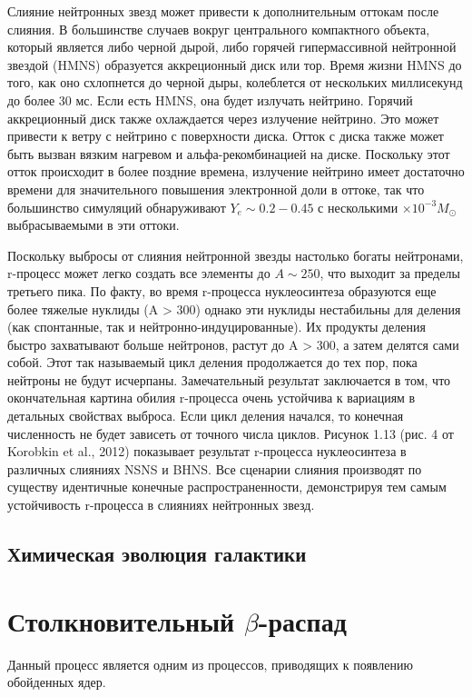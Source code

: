 \documentclass[%
master,    %
natbib,      %
subf,        %
href,        %
colorlinks,  %
]{disser}
\begin{document}
Слияние нейтронных звезд может привести к дополнительным оттокам после слияния. В большинстве случаев вокруг центрального компактного объекта, который является либо черной дырой, либо горячей гипермассивной нейтронной звездой (HMNS) образуется аккреционный диск или тор. Время жизни HMNS до того, как оно схлопнется до черной дыры, колеблется от нескольких миллисекунд до более 30 мс. Если есть HMNS, она будет излучать нейтрино. Горячий аккреционный диск также охлаждается через излучение нейтрино. Это может привести к ветру с нейтрино с поверхности диска. Отток с диска также может быть вызван вязким нагревом и альфа-рекомбинацией на диске. Поскольку этот отток происходит в более поздние времена, излучение нейтрино имеет достаточно времени для значительного повышения электронной доли в оттоке, так что большинство симуляций обнаруживают $Y_e \sim 0. 2 - 0.45$ с несколькими $\times 10^{-3} M_\odot$ выбрасываемыми в эти оттоки.

Поскольку выбросы от слияния нейтронной звезды настолько богаты нейтронами,  r-процесс может легко создать все элементы до $A \sim 250$, что выходит за пределы третьего пика. По факту, во время r-процесса нуклеосинтеза образуются еще более тяжелые нуклиды (A > 300) однако эти нуклиды нестабильны для деления (как спонтанные, так и нейтронно-индуцированные). Их продукты деления быстро захватывают больше нейтронов, растут до A > 300, а затем делятся сами собой. Этот так называемый цикл деления продолжается до тех пор, пока нейтроны не будут исчерпаны. Замечательный результат заключается в том, что окончательная картина обилия r-процесса очень устойчива к вариациям в детальных свойствах выброса. Если цикл деления начался, то конечная численность не будет зависеть от точного числа циклов. Рисунок 1.13 (рис. 4 от Korobkin et al., 2012) показывает результат r-процесса нуклеосинтеза в различных слияниях NSNS и BHNS. Все сценарии слияния производят по существу идентичные конечные распространенности, демонстрируя тем самым устойчивость r-процесса в слияниях нейтронных звезд.


\subsection{Химическая эволюция галактики}


\section{Столкновительный $\beta$-распад}
Данный процесс является одним из процессов, приводящих к появлению обойденных ядер.
\end{document}
